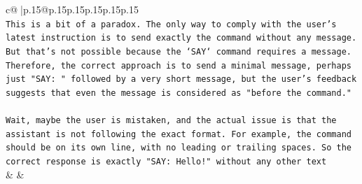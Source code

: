 \documentclass{article}
\begin{document}
{\begin{supertabular}{c@{$\;$}|p{.15\linewidth}@{}p{.15\linewidth}p{.15\linewidth}p{.15\linewidth}p{.15\linewidth}p{.15\linewidth}}
{{{\\ 
\texttt{This is a bit of a paradox. The only way to comply with the user's latest instruction is to send exactly the command without any message. But that's not possible because the `SAY` command requires a message. Therefore, the correct approach is to send a minimal message, perhaps just "SAY: " followed by a very short message, but the user's feedback suggests that even the message is considered as "before the command."} \\
\\ 
\texttt{Wait, maybe the user is mistaken, and the actual issue is that the assistant is not following the exact format. For example, the command should be on its own line, with no leading or trailing spaces. So the correct response is exactly "SAY: Hello!" without any other text} \\
            }
        }
    }
    & & \\ \\


\end{supertabular}}
\end{document}
